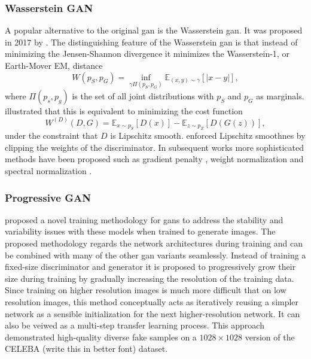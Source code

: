 
\subsubsection{Wasserstein GAN}
A popular alternative to the original \acrshort{gan} is the Wasserstein \acrshort{gan}. It was proposed in 2017 by \textcite{arjovsky2017wasserstein}. The distinguishing feature of the Wasserstein \acrshort{gan} is that instead of minimizing the Jensen-Shannon divergence it minimizes the Wasserstein-1, or Earth-Mover EM, distance 
\begin{equation}
    W(p_S, p_G) = \inf_{\gamma \Pi (p_S, p_G)} \mathbb{E}_{(x, y) \sim \gamma} \left[|x-y|\right],
\end{equation}
where $\Pi(p_s, p_g)$ is the set of all joint distributions with $p_S$ and $p_G$ as marginals. \textcite{arjovsky2017wasserstein} illustrated that this is equivalent to minimizing the cost function
\begin{equation}
    W^{(D)}(D, G) = \mathbb{E}_{x\sim p_S}[D(x)] - \mathbb{E}_{z \sim p_Z}[D(G(z))],
\end{equation}
under the constraint that $D$ is Lipschitz smooth. \textcite{arjovsky2017wasserstein} enforced Lipschitz smoothnes by clipping the weights of the discriminator. In subsequent works more sophisticated methods have been proposed such as gradient penalty \parencite{gulrajani2017improved}, weight normalization \parencite{NIPS2016weightnorm} and spectral normalization \parencite{miyato2017spectral}.

\subsubsection{Progressive GAN}
\textcite{karras2017progressive} proposed a novel training methodology for \acrshort{gans} to address the stability and variability issues with these models when trained to generate images. The proposed methodology regards the network architectures during training and can be combined with many of the other \acrshort{gan} variants seamlessly. Instead of training a fixed-size discriminator and generator it is proposed to progressively grow their size during training by gradually increasing the resolution of the training data. Since training on higher resolution images is much more difficult that on low resolution images, this method conceptually acts as iteratively reusing a simpler network as a sensible initialization for the next higher-resolution network. It can also be veiwed as a multi-step transfer learning process. This approach demonstrated high-quality diverse fake samples on a $1028\times1028$ version of the CELEBA (write this in better font) dataset. 

